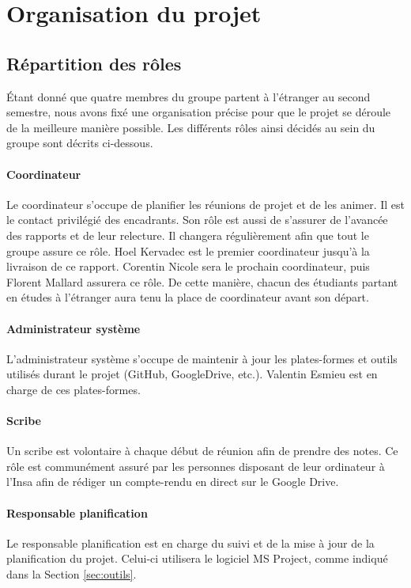 \section{Organisation du projet}
	\subsection{Répartition des rôles}
	    Étant donné que quatre membres du groupe partent à l'étranger au second semestre, nous avons fixé une organisation précise pour que le projet se déroule de la meilleure manière possible. Les différents rôles ainsi décidés au sein du groupe sont décrits ci-dessous.
	    
	    \paragraph{Coordinateur} Le coordinateur s'occupe de planifier les réunions de projet et de les animer. Il est le contact privilégié des encadrants. Son rôle est aussi de s'assurer de l'avancée des rapports et de leur relecture. Il changera régulièrement afin que tout le groupe assure ce rôle. Hoel Kervadec est le premier coordinateur jusqu'à la livraison de ce rapport. Corentin Nicole sera le prochain coordinateur, puis Florent Mallard assurera ce rôle. De cette manière, chacun des étudiants partant en études à l'étranger aura tenu la place de coordinateur avant son départ.
	    
	    \paragraph{Administrateur système} L'administrateur système s'occupe de maintenir à jour les plates-formes et outils utilisés durant le projet (GitHub, GoogleDrive, etc.). Valentin Esmieu est en charge de ces plates-formes.
	    
	    \paragraph{Scribe} Un scribe est volontaire à chaque début de réunion afin de prendre des notes. Ce rôle est communément assuré par les personnes disposant de leur ordinateur à l'{\sc Insa} afin de rédiger un compte-rendu en direct sur le Google Drive.
	    
	    \paragraph{Responsable planification} Le responsable planification est en charge du suivi et de la mise à jour de la planification du projet. Celui-ci utilisera le logiciel MS Project, comme indiqué dans la Section \ref{sec:outils}.
	    
